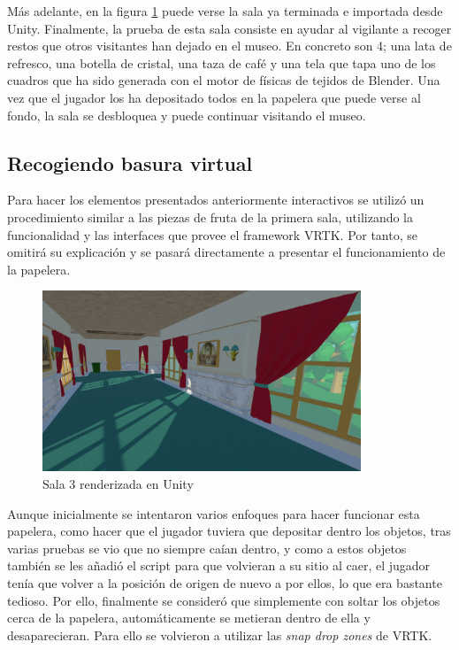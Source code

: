 Más adelante, en la figura \ref{fig:unity-sala-3} puede verse la sala ya terminada e importada desde Unity. Finalmente, la prueba de esta sala consiste en ayudar al vigilante a recoger restos que otros visitantes han dejado en el museo. En concreto son 4; una lata de refresco, una botella de cristal, una taza de café y una tela que tapa uno de los cuadros que ha sido generada con el motor de físicas de tejidos de Blender. Una vez que el jugador los ha depositado todos en la papelera que puede verse al fondo, la sala se desbloquea y puede continuar visitando el museo.

\subsection{Recogiendo basura virtual}

Para hacer los elementos presentados anteriormente interactivos se utilizó un procedimiento similar a las piezas de fruta de la primera sala, utilizando la funcionalidad y las interfaces que provee el framework \acs{VRTK}. Por tanto, se omitirá su explicación y se pasará directamente a presentar el funcionamiento de la papelera.

\begin{figure}[!h]
\begin{center}
\includegraphics[width=0.85\textwidth]{imagenes/7/salas-unity/unity-sala-3.png}
\caption{Sala 3 renderizada en Unity}
\label{fig:unity-sala-3}
\end{center}
\end{figure}

Aunque inicialmente se intentaron varios enfoques para hacer funcionar esta papelera, como hacer que el jugador tuviera que depositar dentro los objetos, tras varias pruebas se vio que no siempre caían dentro, y como a estos objetos también se les añadió el script para que volvieran a su sitio al caer, el jugador tenía que volver a la posición de origen de nuevo a por ellos, lo que era bastante tedioso. Por ello, finalmente se consideró que simplemente con soltar los objetos cerca de la papelera, automáticamente se metieran dentro de ella y desaparecieran. Para ello se volvieron a utilizar las \textit{snap drop zones} de \acs{VRTK}. 

